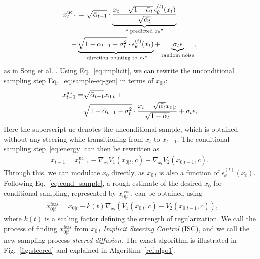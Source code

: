 \documentclass[10pt,twocolumn,letterpaper]{article}
\begin{document}
\begin{align}
    x_{t-1}^{\text{uc}}  &= \sqrt{\bar{\alpha}_{t-1}}\cdot \underbrace{\frac{x_t - \sqrt{1 - \bar{\alpha}_t} \, \epsilon_\theta^{(t)}(x_t)}{\sqrt{\bar{\alpha_t}}}}_{\text{`` predicted } x_0 \text{''}} \notag\\
    + &\underbrace{\sqrt{1 - \bar{\alpha}_{t-1} - \sigma_t^2} \cdot \epsilon_\theta^{(t)}(x_t)}_{\text{``direction pointing to } x_t \text{''}} + \underbrace{\sigma_t \epsilon}_{\text{random noise}}, \label{eq:sample-eq-gen}
\end{align}
as in Song et al. \cite{song2020denoising}. 
Using Eq.~\eqref{eq:implicit}, we can rewrite the unconditional sampling step Eq.~\eqref{eq:sample-eq-gen} in terms of $x_{0|t}$:
\begin{align}
\label{eq:uc}
    x_{t-1}^{\text{uc}} =  &\sqrt{\bar{\alpha}_{t-1}} x_{0|t} \;+ \notag\\ 
    &\sqrt{1 - \bar{\alpha}_{t-1} - \sigma_t^2} \cdot \frac{ x_t - \sqrt{\bar{\alpha_t}} x_{0|t} }{\sqrt{1 - \bar{\alpha}_t}}+ \sigma_t \epsilon,
\end{align}
Here the superscript uc denotes the unconditional sample, which is obtained without any steering while transitioning from $x_t$ to $x_{t-1}$. The conditional sampling step~\eqref{eq:energy} can then be rewritten as
\begin{align}
    x_{t-1}  =  x_{t-1}^{\text{uc}}
   -\nabla_{x_t} V_1(x_{0|t},c)  + \nabla_{x_t} V_2(x_{0|t-1},c).
 \label{eq:cond_sample}
\end{align}
Through this, we can modulate $x_0$ directly, as $x_{0|t}$ is also a function of $\epsilon_{\theta}^{(t)}(x_t)$. Following Eq.~\eqref{eq:cond_sample}, a rough estimate of the desired $x_0$ for conditional sampling, represented by $x_{0|t}^\mathrm{feas}$, can be obtained using 
\begin{align}
    &x_{0|t}^\mathrm{feas} = x_{0|t}  -k(t) \nabla_{x_t}\left( V_1(x_{0|t},c) -V_2(x_{0|t-1},c)\right),
    \label{feas_eq}
\end{align}
where $k(t)$ is a scaling factor defining the strength of regularization.  We call the process of finding $x_{0|t}^\mathrm{feas}$ from $x_{0|t}$ {\it Implicit Steering Control} (ISC), and we call the new sampling process {\it steered diffusion}. The exact algorithm is illustrated in Fig.~\ref{fig:steered} and explained in Algorithm~\ref{ref:algo1}.
\end{document}
